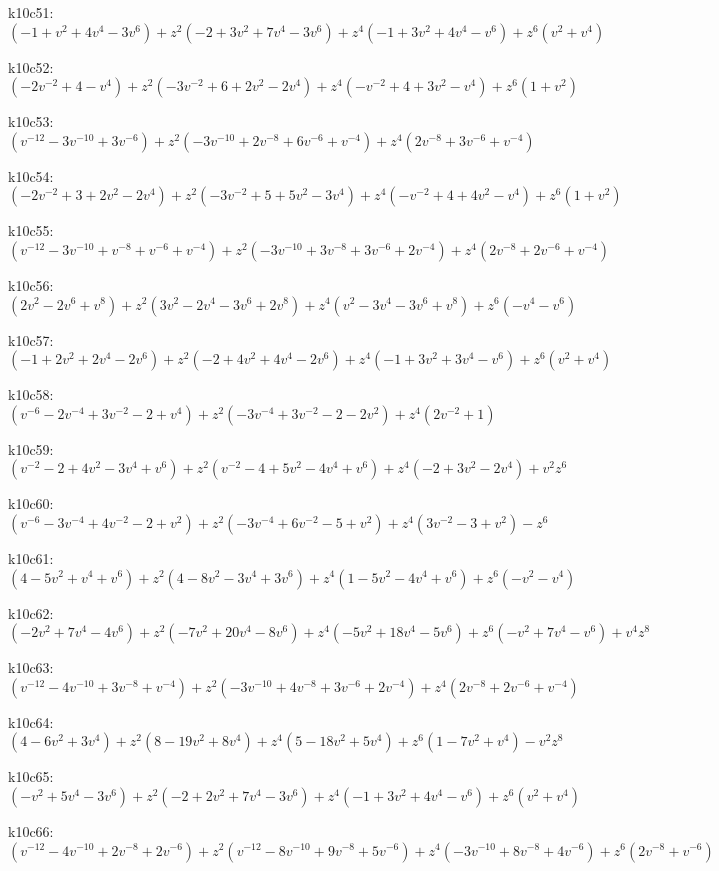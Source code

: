 k10c51: $ (-1+v^{2}+4v^{4}-3v^{6})  +z^{2}(-2+3v^{2}+7v^{4}-3v^{6})  +z^{4}(-1+3v^{2}+4v^{4}-v^{6})  +z^{6}(v^{2}+v^{4}) $ 

k10c52: $ (-2v^{-2}+4-v^{4})  +z^{2}(-3v^{-2}+6+2v^{2}-2v^{4})  +z^{4}(-v^{-2}+4+3v^{2}-v^{4})  +z^{6}(1+v^{2}) $ 

k10c53: $ (v^{-12}-3v^{-10}+3v^{-6})  +z^{2}(-3v^{-10}+2v^{-8}+6v^{-6}+v^{-4})  +z^{4}(2v^{-8}+3v^{-6}+v^{-4}) $ 

k10c54: $ (-2v^{-2}+3+2v^{2}-2v^{4})  +z^{2}(-3v^{-2}+5+5v^{2}-3v^{4})  +z^{4}(-v^{-2}+4+4v^{2}-v^{4})  +z^{6}(1+v^{2}) $ 

k10c55: $ (v^{-12}-3v^{-10}+v^{-8}+v^{-6}+v^{-4})  +z^{2}(-3v^{-10}+3v^{-8}+3v^{-6}+2v^{-4})  +z^{4}(2v^{-8}+2v^{-6}+v^{-4}) $ 

k10c56: $ (2v^{2}-2v^{6}+v^{8})  +z^{2}(3v^{2}-2v^{4}-3v^{6}+2v^{8})  +z^{4}(v^{2}-3v^{4}-3v^{6}+v^{8})  +z^{6}(-v^{4}-v^{6}) $ 

k10c57: $ (-1+2v^{2}+2v^{4}-2v^{6})  +z^{2}(-2+4v^{2}+4v^{4}-2v^{6})  +z^{4}(-1+3v^{2}+3v^{4}-v^{6})  +z^{6}(v^{2}+v^{4}) $ 

k10c58: $ (v^{-6}-2v^{-4}+3v^{-2}-2+v^{4})  +z^{2}(-3v^{-4}+3v^{-2}-2-2v^{2})  +z^{4}(2v^{-2}+1) $ 

k10c59: $ (v^{-2}-2+4v^{2}-3v^{4}+v^{6})  +z^{2}(v^{-2}-4+5v^{2}-4v^{4}+v^{6})  +z^{4}(-2+3v^{2}-2v^{4})  +v^{2}z^{6} $ 

k10c60: $ (v^{-6}-3v^{-4}+4v^{-2}-2+v^{2})  +z^{2}(-3v^{-4}+6v^{-2}-5+v^{2})  +z^{4}(3v^{-2}-3+v^{2})  -z^{6} $ 

k10c61: $ (4-5v^{2}+v^{4}+v^{6})  +z^{2}(4-8v^{2}-3v^{4}+3v^{6})  +z^{4}(1-5v^{2}-4v^{4}+v^{6})  +z^{6}(-v^{2}-v^{4}) $ 

k10c62: $ (-2v^{2}+7v^{4}-4v^{6})  +z^{2}(-7v^{2}+20v^{4}-8v^{6})  +z^{4}(-5v^{2}+18v^{4}-5v^{6})  +z^{6}(-v^{2}+7v^{4}-v^{6})  +v^{4}z^{8} $ 

k10c63: $ (v^{-12}-4v^{-10}+3v^{-8}+v^{-4})  +z^{2}(-3v^{-10}+4v^{-8}+3v^{-6}+2v^{-4})  +z^{4}(2v^{-8}+2v^{-6}+v^{-4}) $ 

k10c64: $ (4-6v^{2}+3v^{4})  +z^{2}(8-19v^{2}+8v^{4})  +z^{4}(5-18v^{2}+5v^{4})  +z^{6}(1-7v^{2}+v^{4})  -v^{2}z^{8} $ 

k10c65: $ (-v^{2}+5v^{4}-3v^{6})  +z^{2}(-2+2v^{2}+7v^{4}-3v^{6})  +z^{4}(-1+3v^{2}+4v^{4}-v^{6})  +z^{6}(v^{2}+v^{4}) $ 

k10c66: $ (v^{-12}-4v^{-10}+2v^{-8}+2v^{-6})  +z^{2}(v^{-12}-8v^{-10}+9v^{-8}+5v^{-6})  +z^{4}(-3v^{-10}+8v^{-8}+4v^{-6})  +z^{6}(2v^{-8}+v^{-6}) $ 

